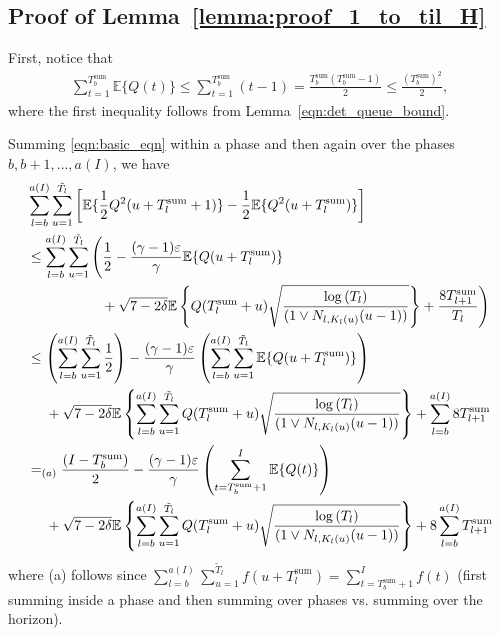 \documentclass[12pt,draftcls, onecolumn]{IEEEtran}
\begin{document}
{\subsection{Proof of Lemma~\ref{lemma:proof_1_to_til_H}}\label{app:proof_1_to_til_H}
First, notice that
\begin{align}\label{eqn:1_to_tbsum}
    \sum_{t=1}^{ T^{\text{sum}}_b}\mathbb{E}\{Q(t)\} \leq\sum_{t=1}^{ T^{\text{sum}}_b}(t-1) =\frac{T^{\text{sum}}_b(T^{\text{sum}}_b-1)}{2} \leq \frac{(T^{\text{sum}}_b)^2}{2},
\end{align}
where the first inequality follows from Lemma~\ref{eqn:det_queue_bound}.

Summing \eqref{eqn:basic_eqn} within a phase and then again over the phases $b,b+1,\dots,a(I)$, we have
\begin{align}
&\sum_{l=b}^{a( I)}\sum_{u=1}^{\tilde{T}_l}\left[\mathbb{E}\{\frac{1}{2}Q^2(u+T^{\text{sum}}_l+1)\} - \frac{1}{2}\mathbb{E}\{Q^2(u+T^{\text{sum}}_l)\}\right]\nonumber\\& \leq \sum_{l=b}^{a( I)}\sum_{u=1}^{\tilde{T}_l} \Bigg{(}\frac{1}{2} -\frac{(\gamma -1)\varepsilon}{\gamma}\mathbb{E}\{Q(u+T^{\text{sum}}_l)\}\nonumber\\&\ \ \ \ \quad\quad\quad\quad +  \sqrt{7-2\delta}\mathbb{E}\left\{Q(T^{\text{sum}}_l+u)\sqrt{\frac{\log\left(T_l\right)}{(1 \vee N_{l,K_l(u)}(u-1))}}\right\} +\frac{8T^{\text{sum}}_{l+1}}{T_l}\Bigg{)} \nonumber\\& \leq \left(\sum_{l=b}^{a( I)}\sum_{u=1}^{\tilde{T}_l} \frac{1}{2}\right) - \frac{(\gamma -1)\varepsilon}{\gamma}\left( \sum_{l=b}^{a( I)}\sum_{u=1}^{\tilde{T}_l} \mathbb{E}\{Q(u+T^{\text{sum}}_l)\}\right)\nonumber\\&\ \ \ \   + \sqrt{7-2\delta} \mathbb{E}\left\{\sum_{l=b}^{a( I)}\sum_{u=1}^{\tilde{T}_l} Q(T^{\text{sum}}_l+u)\sqrt{\frac{\log\left(T_l\right)}{(1 \vee N_{l,K_l(u)}(u-1))}}\right\}  + \sum_{l=b}^{a( I)}8T^{\text{sum}}_{l+1}\nonumber\\& =_{(a)} \frac{( I-T^{\text{sum}}_b)}{2} - \frac{(\gamma -1)\varepsilon}{\gamma}\left( \sum_{t=T^{\text{sum}}_b+1}^{ I} \mathbb{E}\{Q(t)\}\right) \nonumber\\&\ \ \ \ + \sqrt{7-2\delta} \mathbb{E}\left\{\sum_{l=b}^{a( I)}\sum_{u=1}^{\tilde{T}_l} Q(T^{\text{sum}}_l+u)\sqrt{\frac{\log\left(T_l\right)}{(1 \vee N_{l,K_l(u)}(u-1))}}\right\} +8\sum_{l=b}^{a( I)}T^{\text{sum}}_{l+1} \nonumber
\end{align}
where (a) follows since $\sum_{l=b}^{a( I)}\sum_{u=1}^{\tilde{T}_l} f(u+T^{\text{sum}}_l) = \sum_{t= T^{\text{sum}}_b+1}^{I} f(t)$ (first summing inside a phase and then summing over phases vs. summing over the horizon).
}
\end{document}
